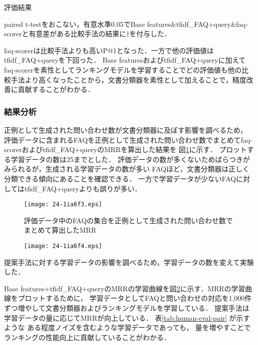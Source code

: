 \documentclass[japanese]{jnlp_1.4}
\begin{document}
\begin{table}[t]
\caption{評価結果}
\label{tab:compare}

\vspace{4pt}\small
paired t-testをおこない，有意水準0.05でBase features\&tfidf\_FAQ+query\&faq-scorerと有意差がある比較手法の結果に$\dagger$を付与した．
\end{table}

faq-scorerは比較手法よりも高いP@1となった．一方で他の評価値はtfidf\_FAQ+queryを下回った．
Base featuresおよびtfidf\_FAQ+queryに加えてfaq-scorerを素性としてランキングモデルを学習することでどの評価値も他の比較手法より高くなったことから，文書分類器を素性として加えることで，精度改善に貢献することがわかる．


\subsubsection{結果分析}

正例として生成された問い合わせ数が文書分類器に及ぼす影響を調べるため，
評価データに含まれるFAQを正例として生成された問い合わせ数でまとめてfaq-scorerおよびtfidf\_FAQ+queryのMRRを算出した結果を
図\ref{fig:mrr-numtrain}に示す．
  プロットする学習データの数は25までとした．
  評価データの数が多くないためばらつきがみられるが，生成される学習データの数が多い
  FAQほど，文書分類器は正しく分類できる傾向にあることを確認できる．
  一方で学習データが少ないFAQに対してはtfidf\_FAQ+queryよりも誤りが多い．

\begin{figure}[b]
\begin{center}
\texttt{[image: 24-1ia6f3.eps]}
\end{center}
\caption{評価データ中のFAQの集合を正例として生成された問い合わせ数でまとめて算出したMRR}
\label{fig:mrr-numtrain}
\end{figure}
\begin{figure}[b]
\begin{center}
\texttt{[image: 24-1ia6f4.eps]}
\end{center}
\label{fig:mrr-lr}
\end{figure}


提案手法に対する学習データの影響を調べるため，学習データの数を変えて実験した．

Base features+tfidf\_FAQ+queryのMRRの学習曲線を図\ref{fig:mrr-lr}に示す．MRRの学習曲線をプロットするために，
学習データとしてFAQと問い合わせの対応を1,000件ずつ増やして文書分類器およびランキングモデルを学習している．
提案手法は学習データの量に応じてMRRが向上している．
表\ref{tab:human-eval-pair}
が示すような
ある程度ノイズを含むような学習データであっても，
量を増やすことでランキングの性能向上に貢献していることがわかる．
\end{document}
